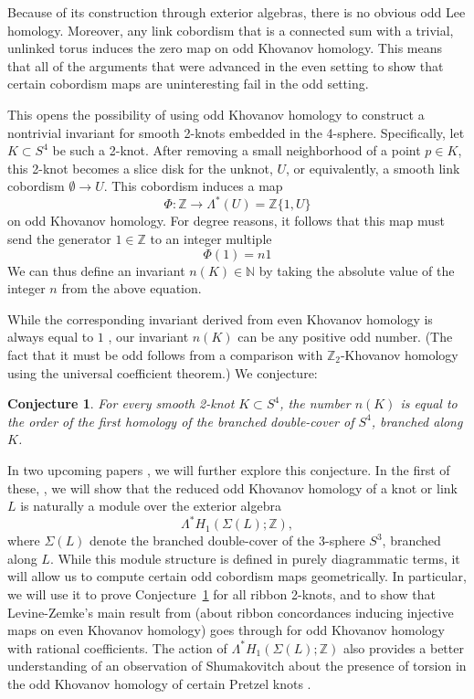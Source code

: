 \documentclass[12pt]{amsart}
\theoremstyle{definition}
\theoremstyle{plain}
\newtheorem{conjecture}{Conjecture}
\begin{document}
Because of its construction through exterior algebras, there is no obvious odd Lee homology.
Moreover, any link cobordism that is a connected sum with a trivial, unlinked torus induces
the zero map on odd Khovanov homology. This means that all of the arguments that were
advanced in the even setting \cite{Ra2005,CSS2006,Ta2006} to show that certain cobordism maps
are uninteresting fail in the odd setting.

This opens the possibility of using odd Khovanov homology to construct
a nontrivial invariant for smooth 2-knots embedded in the 4-sphere. Specifically, let $K\subset S^4$ be such a
2-knot. After removing a small neighborhood of a point $p\in K$,
this 2-knot becomes a slice disk for the unknot, $U$,
or equivalently, a smooth link cobordism $\emptyset\rightarrow U$.
This cobordism
induces a map
\[
\Phi\colon\mathbb{Z}\longrightarrow\Lambda^*(U)=\mathbb{Z}\{1,U\}
\]
on odd Khovanov homology. For degree reasons, it follows
that this map must send the generator $1\in\mathbb{Z}$ to an integer multiple
\[
\Phi(1)=n1
\]
We can thus define an invariant $n(K)\in\mathbb{N}$ by taking
the absolute value of the integer $n$ from the above equation.

While the corresponding invariant derived from even Khovanov homology is
always equal to $1$  \cite{Ra2005,Ta2006}, our invariant $n(K)$ can be any positive odd number.
(The fact that it must be odd follows from a comparison with $\mathbb{Z}_2$-Khovanov
homology using the universal coefficient theorem.)
We conjecture:

\begin{conjecture}\label{conj:2knots}
For every smooth 2-knot $K\subset S^4$, the number
$n(K)$ is equal to the order of the first homology
of the branched double-cover of $S^4$, branched along $K$.
\end{conjecture}

In two upcoming papers \cite{MW2024a,MW2024b}, we will further explore this conjecture.
In the first of these, \cite{MW2024a}, we will show that the reduced odd Khovanov homology
of a knot or link $L$ is naturally a module over the exterior algebra
\[
\Lambda^*H_1(\Sigma(L);\mathbb{Z}),
\]
where $\Sigma(L)$ denote the branched double-cover of the 3-sphere $S^3$, branched along $L$.
While this module structure is defined in purely diagrammatic terms, it will allow us to compute
certain odd cobordism maps geometrically.
In particular, we will use it to prove Conjecture~\ref{conj:2knots}
for all ribbon 2-knots, and to show that Levine-Zemke's main result from \cite{LZ2019} (about
ribbon concordances inducing injective maps on even Khovanov homology)
goes through for odd Khovanov homology with rational coefficients. The
action of $\Lambda^*H_1(\Sigma(L);\mathbb{Z})$ also provides a better understanding of
an observation of Shumakovitch about the presence of torsion in the odd Khovanov homology
of certain Pretzel knots \cite{Sh2011}.
\end{document}
